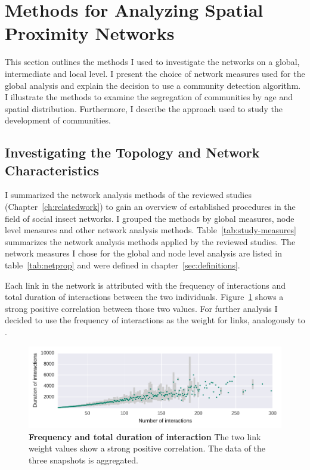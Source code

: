 \section{Methods for Analyzing Spatial Proximity Networks}
This section outlines the methods I used to investigate the networks on a global, intermediate and local level.
I present the choice of network measures used for the global analysis and explain the decision to use a community detection algorithm.
I illustrate the methods to examine the segregation of communities by age and spatial distribution.
Furthermore, I describe the approach used to study the development of communities.

\subsection{Investigating the Topology and Network Characteristics}
\label{subsec:APmeasures}
I summarized the network analysis methods of the reviewed studies (Chapter~\ref{ch:relatedwork}) to gain an overview of established procedures in the field of social insect networks.
I grouped the methods by global measures, node level measures and other network analysis methods.
Table~\ref{tab:study-measures} summarizes the network analysis methods applied by the reviewed studies.
The network measures I chose for the global and node level analysis are listed in table~\ref{tab:netprop} and were defined in chapter~\ref{sec:definitions}.

Each link in the network is attributed with the frequency of interactions and total duration of interactions between the two individuals.
Figure~\ref{fig:fVSd} shows a strong positive correlation between those two values.
For further analysis I decided to use the frequency of interactions as the weight for links, analogously to \cite{mersch2013tracking,baracchi2014socio}.


\begin{figure}[htb]
	\centering
	\includegraphics[width=1.0\textwidth]{Figures/n3-freqVSduration}
	\caption[Frequency and total duration of interaction]{\textbf{Frequency and total duration of interaction} The two link weight values show a strong positive correlation. The data of the three snapshots is aggregated.}
	\label{fig:fVSd}
\end{figure}

